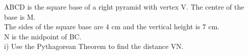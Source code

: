 \documentclass[preview]{standalone}
\begin{document}
\begin{center}
\begin{minipage}{12cm}\raggedright ABCD is the square base of a right pyramid with vertex V. The centre of the base is M.\\ The sides of the square base are 4 cm and the vertical height is 7 cm.\\ N is the midpoint of BC.\\ i) Use the Pythagorean Theorem to find the distance VN.\end{minipage}
\end{center}
\end{document}
